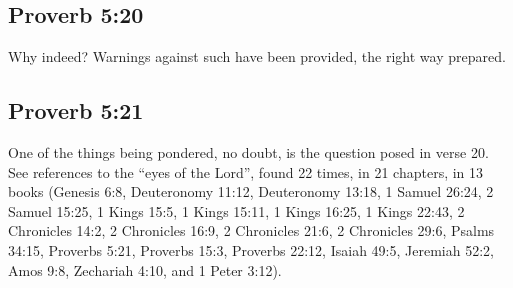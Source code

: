 \subsection{Proverb 5:20}
Why indeed? Warnings against such have been provided, the right way prepared. 

\subsection{Proverb 5:21}
One of the things being pondered, no doubt, is the question posed in verse 20. See references to the ``eyes of the Lord'', found 22 times, in 21 chapters, in 13 books (Genesis 6:8, Deuteronomy 11:12, Deuteronomy 13:18, 1 Samuel 26:24, 2 Samuel 15:25, 1 Kings 15:5, 1 Kings 15:11, 1 Kings 16:25, 1 Kings 22:43, 2 Chronicles 14:2, 2 Chronicles 16:9, 2 Chronicles 21:6, 2 Chronicles 29:6, Psalms 34:15, Proverbs 5:21, Proverbs 15:3, Proverbs 22:12, Isaiah 49:5, Jeremiah 52:2, Amos 9:8, Zechariah 4:10, and 1 Peter 3:12).

